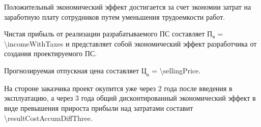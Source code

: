 Положительный экономический эффект достигается за счет экономии затрат на заработную плату сотрудников путем уменьшения трудоемкости работ.

Чистая прибыль от реализации разрабатываемого ПС составляет $ \text{П}_\text{ч} $ = \SI{\incomeWithTaxes}{\byr{}}
и представляет собой экономический эффект разработчика от создания проектируемого ПС.

Прогнозируемая отпускная цена составляет $ \text{Ц}_\text{о} $ = \SI{\sellingPrice}{\byr{}}.

На стороне заказчика проект окупится уже через 2 года после введения в эксплуатацию,
а через 3 года общий дисконтированный экономический эффект в виде превышения прироста прибыли над затратами составит \SI{\resultCostAccumDiffThree}{\byr}.

